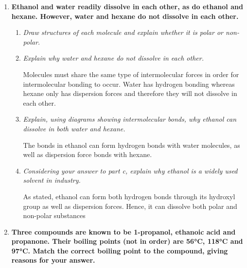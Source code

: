\documentclass{report}
\begin{document}
\begin{enumerate}
		\item \textbf{Ethanol and water readily dissolve in each other, as do ethanol and hexane. However, water and hexane do not dissolve in each other.}

			\begin{enumerate}
				\item \textit{Draw structures of each molecule and explain whether it is polar or non-polar.}

					\begin{center}
					\end{center}
					\begin{center}
					\end{center}
					\begin{center}
					\end{center}

				\item \textit{Explain why water and hexane do not dissolve in each other.}

					Molecules must share the same type of intermolecular forces in order for intermolecular bonding to occur. Water has hydrogen bonding whereas hexane only has dispersion forces and therefore they will not dissolve in each other.

				\item \textit{Explain, using diagrams showing intermolecular bonds, why ethanol can dissolve in both water and hexane.}

					The  bonds in ethanol can form hydrogen bonds with water molecules, as well as dispersion force bonds with hexane.

				\item \textit{Considering your answer to part c, explain why ethanol is a widely used solvent in industry.}

					As stated, ethanol can form both hydrogen bonds through its hydroxyl group as well as dispersion forces. Hence, it can dissolve both polar and non-polar substances
			\end{enumerate}

		\item \textbf{Three compounds are known to be 1-propanol, ethanoic acid and propanone. Their boiling points (not in order) are 56°C, 118°C and 97°C. Match the correct boiling point to the compound, giving reasons for your answer.}


\end{enumerate}
\end{document}
